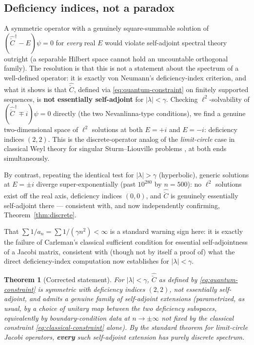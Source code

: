 \documentclass[11pt]{amsart}
\newtheorem{theorem}{Theorem}[section]
\theoremstyle{remark}
\begin{document}
\subsection{Deficiency indices, not a paradox}
A symmetric operator with a genuinely square-summable solution of $(\hat{\check C}^\dagger-E)\psi=0$ for \emph{every} real $E$ would violate self-adjoint spectral theory outright (a separable Hilbert space cannot hold an uncountable orthogonal family). The resolution is that this is not a statement about the spectrum of a well-defined operator: it is exactly von Neumann's deficiency-index criterion, and what it shows is that $\hat{\check C}$, defined via \eqref{eq:quantum-constraint} on finitely supported sequences, is \textbf{not essentially self-adjoint} for $|\lambda|<\gamma$. Checking $\ell^2$-solvability of $(\hat{\check C}^\dagger\mp i)\psi=0$ directly (the two Nevanlinna-type conditions), we find a genuine two-dimensional space of $\ell^2$ solutions at both $E=+i$ and $E=-i$: deficiency indices $(2,2)$. This is the discrete-operator analog of the \emph{limit-circle} case in classical Weyl theory for singular Sturm--Liouville problems \cite{Akhiezer}, at both ends simultaneously.

By contrast, repeating the identical test for $|\lambda|>\gamma$ (hyperbolic), generic solutions at $E=\pm i$ diverge super-exponentially (past $10^{280}$ by $n=500$): no $\ell^2$ solutions exist off the real axis, deficiency indices $(0,0)$, and $\hat{\check C}$ is genuinely essentially self-adjoint there --- consistent with, and now independently confirming, Theorem~\ref{thm:discrete}.

That $\sum1/a_n=\sum1/(\gamma n^2)<\infty$ is a standard warning sign here: it is exactly the failure of Carleman's classical sufficient condition for essential self-adjointness of a Jacobi matrix, consistent with (though not by itself a proof of) what the direct deficiency-index computation now establishes for $|\lambda|<\gamma$.

\begin{theorem}[Corrected statement]\label{thm:corrected}
For $|\lambda|<\gamma$, $\hat{\check C}$ as defined by \eqref{eq:quantum-constraint} is symmetric with deficiency indices $(2,2)$, not essentially self-adjoint, and admits a genuine family of self-adjoint extensions (parametrized, as usual, by a choice of unitary map between the two deficiency subspaces, equivalently by boundary-condition data at $n\to\pm\infty$ not fixed by the classical constraint \eqref{eq:classical-constraint} alone). By the standard theorem for limit-circle Jacobi operators, \textbf{every} such self-adjoint extension has purely discrete spectrum.
\end{theorem}
\end{document}
